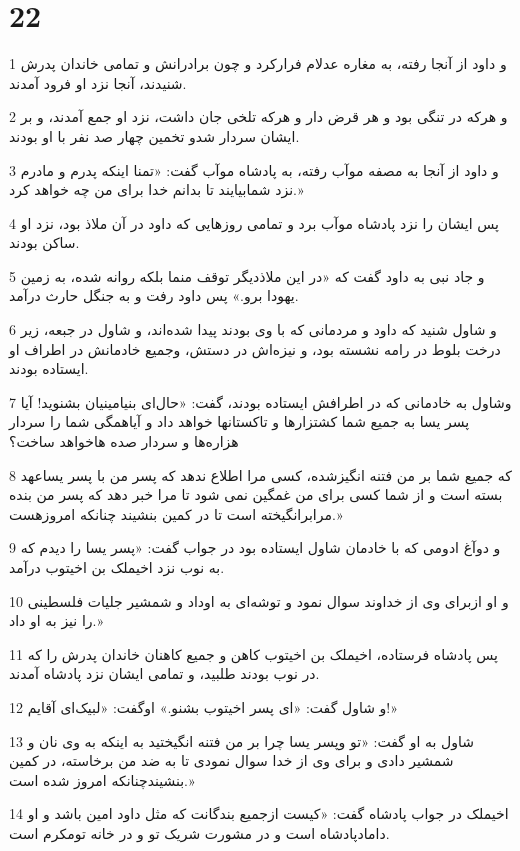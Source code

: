 \chapter{22}

\par 1 و داود از آنجا رفته، به مغاره عدلام فرارکرد و چون برادرانش و تمامی خاندان پدرش شنیدند، آنجا نزد او فرود آمدند.
\par 2 و هرکه در تنگی بود و هر قرض دار و هر‌که تلخی جان داشت، نزد او جمع آمدند، و بر ایشان سردار شدو تخمین چهار صد نفر با او بودند.
\par 3 و داود از آنجا به مصفه موآب رفته، به پادشاه موآب گفت: «تمنا اینکه پدرم و مادرم نزد شمابیایند تا بدانم خدا برای من چه خواهد کرد.»
\par 4 پس ایشان را نزد پادشاه موآب برد و تمامی روزهایی که داود در آن ملاذ بود، نزد او ساکن بودند.
\par 5 و جاد نبی به داود گفت که «در این ملاذدیگر توقف منما بلکه روانه شده، به زمین یهودا برو.» پس داود رفت و به جنگل حارث درآمد.
\par 6 و شاول شنید که داود و مردمانی که با وی بودند پیدا شده‌اند، و شاول در جبعه، زیر درخت بلوط در رامه نشسته بود، و نیزه‌اش در دستش، وجمیع خادمانش در اطراف او ایستاده بودند.
\par 7 وشاول به خادمانی که در اطرافش ایستاده بودند، گفت: «حال‌ای بنیامینیان بشنوید! آیا پسر یسا به جمیع شما کشتزارها و تاکستانها خواهد داد و آیاهمگی شما را سردار هزاره‌ها و سردار صده هاخواهد ساخت؟
\par 8 که جمیع شما بر من فتنه انگیزشده، کسی مرا اطلاع ندهد که پسر من با پسر یساعهد بسته است و از شما کسی برای من غمگین نمی شود تا مرا خبر دهد که پسر من بنده مرابرانگیخته است تا در کمین بنشیند چنانکه امروزهست.»
\par 9 و دوآغ ادومی که با خادمان شاول ایستاده بود در جواب گفت: «پسر یسا را دیدم که به نوب نزد اخیملک بن اخیتوب درآمد.
\par 10 و او ازبرای وی از خداوند سوال نمود و توشه‌ای به اوداد و شمشیر جلیات فلسطینی را نیز به او داد.»
\par 11 پس پادشاه فرستاده، اخیملک بن اخیتوب کاهن و جمیع کاهنان خاندان پدرش را که در نوب بودند طلبید، و تمامی ایشان نزد پادشاه آمدند.
\par 12 و شاول گفت: «ای پسر اخیتوب بشنو.» اوگفت: «لبیک‌ای آقایم!»
\par 13 شاول به او گفت: «تو وپسر یسا چرا بر من فتنه انگیختید به اینکه به وی نان و شمشیر دادی و برای وی از خدا سوال نمودی تا به ضد من برخاسته، در کمین بنشیندچنانکه امروز شده است.»
\par 14 اخیملک در جواب پادشاه گفت: «کیست ازجمیع بندگانت که مثل داود امین باشد و او دامادپادشاه است و در مشورت شریک تو و در خانه تومکرم است.
